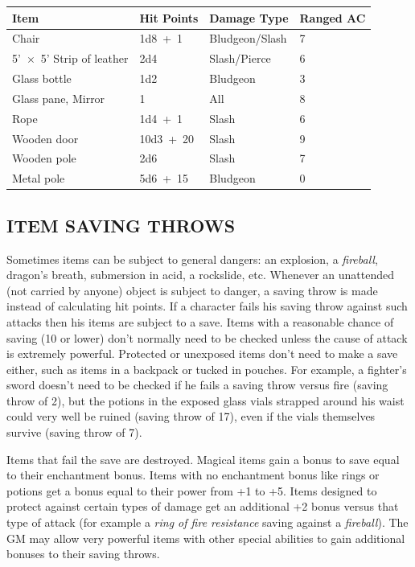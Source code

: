 \begin{multicols}{2}
\noindent
\begin{minipage}{\columnwidth}

\label{damagingobjects}
\noindent
\begin{tabular}{|p{}|p{}|p{}|p{}|}
\hline
Item	& Hit Points	& Damage Type	& Ranged AC \\
\hline\hline
\rowcolor[gray]{.9}Chair	& 1d8~+~1	& Bludgeon/Slash	& 7 \\
5'~$\times$~5' Strip of leather	& 2d4	& Slash/Pierce	& 6 \\
\rowcolor[gray]{.9}Glass bottle	& 1d2	& Bludgeon	& 3 \\
Glass pane, Mirror	& 1	& All	& 8 \\
\rowcolor[gray]{.9}Rope	& 1d4~+~1	& Slash	& 6 \\
Wooden door	& 10d3~+~20	& Slash	& 9 \\
\rowcolor[gray]{.9}Wooden pole	& 2d6	& Slash	& 7 \\
Metal pole	& 5d6~+~15	& Bludgeon	& 0 \\
\hline
\end{tabular}

\end{minipage}

\subsection{ITEM SAVING THROWS}

Sometimes items can be subject to general dangers: an explosion, a \textit{fireball}, dragon's breath, submersion in acid, a rockslide, etc.  Whenever an unattended (not carried by anyone) object is subject to danger, a saving throw is made instead of calculating hit points.  If a character fails his saving throw against such attacks then his items are subject to a save.  Items with a reasonable chance of saving (10 or lower) don't normally need to be checked unless the cause of attack is extremely powerful.  Protected or unexposed items don't need to make a save either, such as items in a backpack or tucked in pouches.  For example, a fighter's sword doesn't need to be checked if he fails a saving throw versus fire (saving throw of 2), but the potions in the exposed glass vials strapped around his waist could very well be ruined (saving throw of 17), even if the vials themselves survive (saving throw of 7).  

Items that fail the save are destroyed.  Magical items gain a bonus to save equal to their enchantment bonus. Items with no enchantment bonus like rings or potions get a bonus equal to their power from +1 to +5.  Items designed to protect against certain types of damage get an additional +2 bonus versus that type of attack (for example a \textit{ring of fire resistance} saving against a \textit{fireball}). The GM may allow very powerful items with other special abilities to gain additional bonuses to their saving throws.


\end{multicols}
